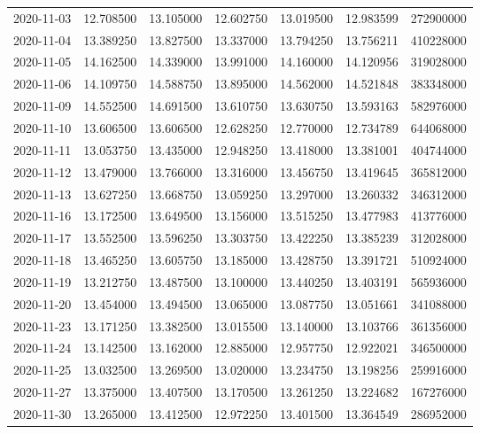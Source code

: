 \begin{tabular}{lrrrrrr}
2020-11-03 &   12.708500 &   13.105000 &   12.602750 &   13.019500 &   12.983599 &   272900000 \\
2020-11-04 &   13.389250 &   13.827500 &   13.337000 &   13.794250 &   13.756211 &   410228000 \\
2020-11-05 &   14.162500 &   14.339000 &   13.991000 &   14.160000 &   14.120956 &   319028000 \\
2020-11-06 &   14.109750 &   14.588750 &   13.895000 &   14.562000 &   14.521848 &   383348000 \\
2020-11-09 &   14.552500 &   14.691500 &   13.610750 &   13.630750 &   13.593163 &   582976000 \\
2020-11-10 &   13.606500 &   13.606500 &   12.628250 &   12.770000 &   12.734789 &   644068000 \\
2020-11-11 &   13.053750 &   13.435000 &   12.948250 &   13.418000 &   13.381001 &   404744000 \\
2020-11-12 &   13.479000 &   13.766000 &   13.316000 &   13.456750 &   13.419645 &   365812000 \\
2020-11-13 &   13.627250 &   13.668750 &   13.059250 &   13.297000 &   13.260332 &   346312000 \\
2020-11-16 &   13.172500 &   13.649500 &   13.156000 &   13.515250 &   13.477983 &   413776000 \\
2020-11-17 &   13.552500 &   13.596250 &   13.303750 &   13.422250 &   13.385239 &   312028000 \\
2020-11-18 &   13.465250 &   13.605750 &   13.185000 &   13.428750 &   13.391721 &   510924000 \\
2020-11-19 &   13.212750 &   13.487500 &   13.100000 &   13.440250 &   13.403191 &   565936000 \\
2020-11-20 &   13.454000 &   13.494500 &   13.065000 &   13.087750 &   13.051661 &   341088000 \\
2020-11-23 &   13.171250 &   13.382500 &   13.015500 &   13.140000 &   13.103766 &   361356000 \\
2020-11-24 &   13.142500 &   13.162000 &   12.885000 &   12.957750 &   12.922021 &   346500000 \\
2020-11-25 &   13.032500 &   13.269500 &   13.020000 &   13.234750 &   13.198256 &   259916000 \\
2020-11-27 &   13.375000 &   13.407500 &   13.170500 &   13.261250 &   13.224682 &   167276000 \\
2020-11-30 &   13.265000 &   13.412500 &   12.972250 &   13.401500 &   13.364549 &   286952000 \\

\end{tabular}
